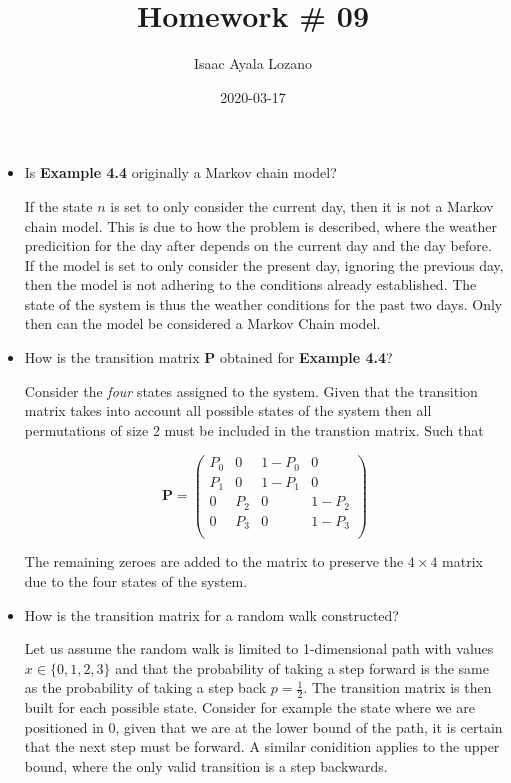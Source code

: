 \documentclass[a4paper,12pt]{article}
\title{Homework \# 09}
\author{Isaac Ayala Lozano}
\date{2020-03-17}
\begin{document}
\maketitle

\begin{itemize}
 \item Is \textbf{Example 4.4} originally a Markov chain model?

 If the state $n$ is set to only consider the current day, then it is not a Markov chain model.
 This is due to how the problem is described, where the weather predicition for the day after depends on the current day and the day before.
 If the model is set to only consider the present day, ignoring the previous day, then the model is not adhering to the conditions already established.
 The state of the system is thus the weather conditions for the past two days.
 Only then can the model be considered a Markov Chain model.

 \item How is the transition matrix $\mathbf{P}$ obtained for \textbf{Example 4.4}?

 Consider the \emph{four} states assigned to the system. Given that the transition matrix takes into account all possible states of the system then all permutations of size 2 must be included in the transtion matrix.
 Such that

 \begin{equation*}
  \mathbf{P} = \begin{pmatrix}
                P_{0} & 0 & 1-P_{0} & 0 \\
                P_{1} & 0 & 1-P_{1} & 0 \\
                0 & P_{2} & 0 & 1-P_{2} \\
                0 & P_{3} & 0 & 1-P_{3} \\
               \end{pmatrix}
 \end{equation*}

The remaining zeroes are added to the matrix to preserve the $4 \times 4$ matrix due to the four states of the system.

\item How is the transition matrix for a random walk constructed?

Let us assume the random walk is limited to 1-dimensional path with values $x \in \{0,1,2,3\}$ and that the probability of taking a step forward is the same as the probability of taking a step back $p = \frac{1}{2}$.
The transition matrix is then built for each possible state.
Consider for example the state where we are positioned in 0, given that we are at the lower bound of the path, it is certain that the next step must be forward.
A similar conidition applies to the upper bound, where the only valid transition is a step backwards.


\end{itemize}
\end{document}
